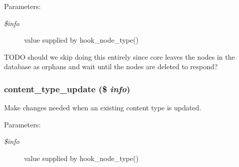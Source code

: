 \begin{Desc}
\item[Parameters:]
\begin{description}
\item[{\em \$info}]value supplied by hook\_\-node\_\-type()\end{description}
\end{Desc}
TODO should we skip doing this entirely since core leaves the nodes in the database as orphans and wait until the nodes are deleted to respond? \hypertarget{content_8crud_8inc_59dc0b70d227d303d61c464a53713414}{
\subsubsection[{content\_\-type\_\-update}]{\setlength{\rightskip}{0pt plus 5cm}content\_\-type\_\-update (\$ {\em info})}}
\label{content_8crud_8inc_59dc0b70d227d303d61c464a53713414}


Make changes needed when an existing content type is updated.

\begin{Desc}
\item[Parameters:]
\begin{description}
\item[{\em \$info}]value supplied by hook\_\-node\_\-type() \end{description}
\end{Desc}
